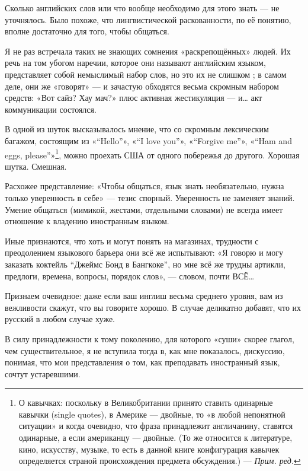 Сколько английских слов или что вообще необходимо для этого знать — не уточнялось. Было похоже, что лингвистической раскованности, по её понятию, вполне достаточно для того, чтобы общаться.

Я не раз встречала таких не знающих сомнения «раскрепощённых» людей. Их речь на том убогом наречии, которое они называют английским языком, представляет собой немыслимый набор слов, но это их не слишком ; в самом деле, они же «говорят» — и зачастую обходятся весьма скромным набором средств: «Вот сайз? Хау мач?» плюс активная жестикуляция — и… акт коммуникации состоялся.

В одной из шуток высказывалось мнение, что со скромным лексическим багажом, состоящим из «``Hello''», «``I love you''», «``Forgive me''», «``Ham and eggs, please''»\footnote{%
    О кавычках: поскольку в Великобритании принято ставить одинарные кавычки (single quotes), в Америке — двойные, то «в любой непонятной ситуации» и когда очевидно, что фраза принадлежит англичанину, ставятся одинарные, а если американцу — двойные. (То же относится к литературе, кино, искусству, музыке, то есть в данной книге конфигурация кавычек определяется страной происхождения предмета обсуждения.) — \textit{Прим. ред.}
}, можно проехать США от одного побережья до другого. Хорошая шутка. Смешная.

Расхожее представление: «Чтобы общаться, язык знать необязательно, нужна только уверенность в себе» — тезис спорный. Уверенность не заменяет знаний. Умение общаться (мимикой, жестами, отдельными словами) не всегда имеет отношение к владению иностранным языком.

Иные признаются, что хоть и могут понять  на магазинах, трудности с преодолением языкового барьера они всё же испытывают: «Я говорю и могу заказать коктейль ``Джеймс Бонд в Бангкоке'', но мне всё же трудны артикли, предлоги, времена, вопросы, порядок слов», — словом, почти ВСЁ…

Признаем очевидное: даже если ваш инглиш весьма среднего уровня, вам из вежливости скажут, что вы говорите хорошо. В случае  деликатно добавят, что их русский в любом случае хуже.

В силу принадлежности к тому поколению, для которого «суши» скорее глагол, чем существительное, я не вступила тогда в, как мне показалось,  дискуссию, понимая, что мои представления о том, как преподавать иностранный язык, сочтут  устаревшими.

